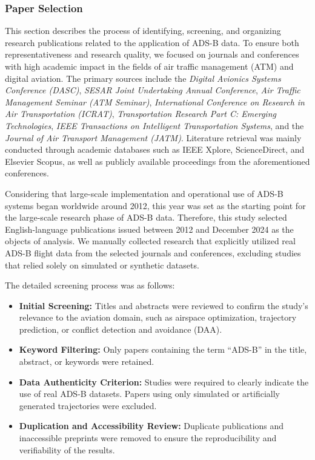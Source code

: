 \subsubsection{Paper Selection}

This section describes the process of identifying, screening, and organizing research publications related to the application of ADS-B data. To ensure both representativeness and research quality, we focused on journals and conferences with high academic impact in the fields of air traffic management (ATM) and digital aviation. The primary sources include the \textit{Digital Avionics Systems Conference (DASC)}, \textit{SESAR Joint Undertaking Annual Conference}, \textit{Air Traffic Management Seminar (ATM Seminar)}, \textit{International Conference on Research in Air Transportation (ICRAT)}, \textit{Transportation Research Part C: Emerging Technologies}, \textit{IEEE Transactions on Intelligent Transportation Systems}, and the \textit{Journal of Air Transport Management (JATM)}. Literature retrieval was mainly conducted through academic databases such as IEEE Xplore, ScienceDirect, and Elsevier Scopus, as well as publicly available proceedings from the aforementioned conferences.

Considering that large-scale implementation and operational use of ADS-B systems began worldwide around 2012, this year was set as the starting point for the large-scale research phase of ADS-B data. Therefore, this study selected English-language publications issued between 2012 and December 2024 as the objects of analysis. We manually collected research that explicitly utilized real ADS-B flight data from the selected journals and conferences, excluding studies that relied solely on simulated or synthetic datasets.

The detailed screening process was as follows:

\begin{itemize}
    \item \textbf{Initial Screening:} Titles and abstracts were reviewed to confirm the study’s relevance to the aviation domain, such as airspace optimization, trajectory prediction, or conflict detection and avoidance (DAA).
    \item \textbf{Keyword Filtering:} Only papers containing the term ``ADS-B'' in the title, abstract, or keywords were retained.
    \item \textbf{Data Authenticity Criterion:} Studies were required to clearly indicate the use of real ADS-B datasets. Papers using only simulated or artificially generated trajectories were excluded.
    \item \textbf{Duplication and Accessibility Review:} Duplicate publications and inaccessible preprints were removed to ensure the reproducibility and verifiability of the results.
\end{itemize}

